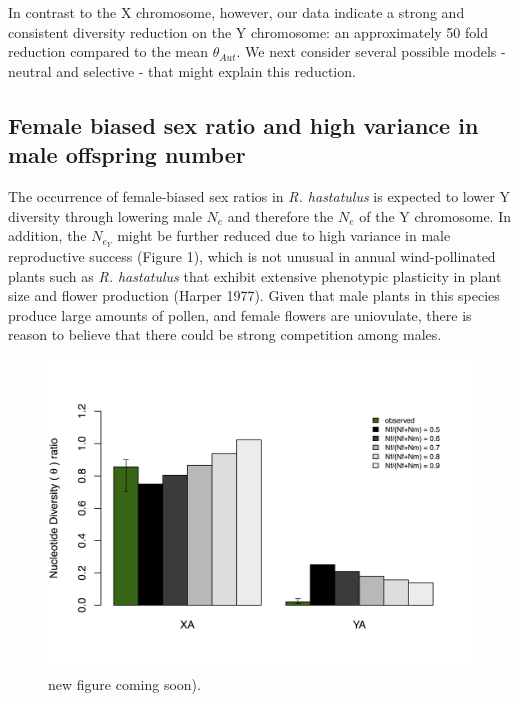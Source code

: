 \documentclass[9pt,twocolumn,twoside]{gsajnl}
\begin{document}
In contrast to the X chromosome, however, our data indicate a strong and consistent diversity reduction on the Y chromosome: an approximately 50 fold reduction compared to the mean $\theta_{Aut}$. We next consider several possible models - neutral and selective - that might explain this reduction.

\subsection*{Female biased sex ratio and high variance in male offspring number}

The occurrence of female-biased sex ratios in \textit{R. hastatulus} is expected to lower Y diversity through lowering male $N_{e}$ and therefore the $N_{e}$ of the Y chromosome. In addition, the $N_{e}_{Y}$ might be further reduced due to high variance in male reproductive success (Figure 1), which is not unusual in annual wind-pollinated plants such as \textit{R. hastatulus} that exhibit extensive phenotypic plasticity in plant size and flower production (\X Harper 1977). Given that male plants in this species produce large amounts of pollen, and female flowers are uniovulate, there is reason to believe that there could be strong competition among males.



\begin{figure}[htbp]
\centering
\noindent
\includegraphics[width=\linewidth]{figure2.jpg}
\caption{new figure coming soon).
}
\label{fig:spectrum}
\end{figure}
\end{document}
